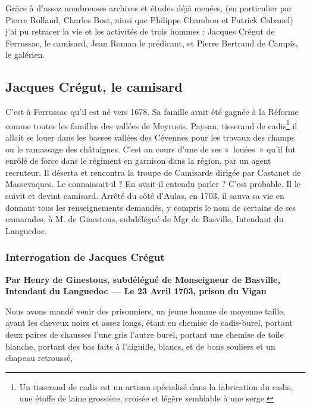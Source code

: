 %




Grâce à d’assez nombreuses archives et études déjà menées, (en particulier par Pierre Rolland, Charles Bost, ainsi que Philippe Chambon et Patrick Cabanel) j’ai pu retracer la vie et les activités de trois hommes ; Jacques Crégut de Ferrussac, le camisard, Jean Roman le prédicant, et Pierre Bertrand de Campis, le galérien.


\subsection{Jacques Crégut, le camisard}

C’est à Ferrussac qu’il est né vers 1678. Sa famille avait été gagnée à la Réforme comme toutes les familles des vallées de Meyrueis. Paysan, tisserand de cadis\footnote{Un tisserand de cadis est un artisan spécialisé dans la fabrication du cadis, une étoffe de laine grossière, croisée et légère semblable à une serge.} il allait se louer dans les basses vallées des Cévennes pour les travaux des champs ou le ramassage des châtaignes. C’est au cours d’une de ses «~louées~» qu’il fut enrôlé de force dans le régiment en garnison dans la région, par un agent recruteur. Il déserta et rencontra la troupe de Camisards dirigée par Castanet de Massevaques. Le connaissait-il ? En avait-il entendu parler ? C’est probable. Il le suivit et devint camisard. Arrêté du côté d’Aulas, en 1703, il sauva sa vie en donnant tous les renseignements demandés, y compris le nom de certains de ses camarades, à M. de Ginestous, subdélégué de Mgr de Basville, Intendant du Languedoc.

\subsubsection{Interrogation de Jacques Crégut}

\textbf{Par Henry de Ginestous, subdélégué de Monseigneur de Basville, Intendant du Languedoc --- Le 23 Avril 1703, prison du Vigan}

Nous avons mandé venir des prisonniers, un jeune homme de moyenne taille, ayant les cheveux noirs et assez longs, étant en chemise de cadis-burel, portant deux paires de chausses l’une gris l’autre burel, portant une chemise de toile blanche, portant des bas faits à l’aiguille, blancs, et de bons souliers et un chapeau retroussé,

